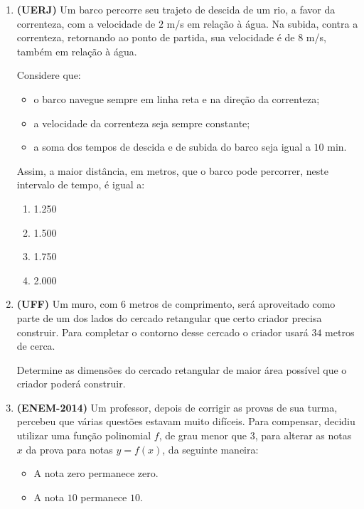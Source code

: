 {\begin{enumerate}
\item \textbf{(UERJ)} Um barco percorre seu trajeto de descida de um rio, a favor da correnteza, com a velocidade de \(2\) m/s em relação à água. Na subida, contra a correnteza, retornando ao ponto de partida, sua velocidade é de \(8\) m/s, também em relação à água.

Considere que:
\begin{itemize}
\item {} 
o barco navegue sempre em linha reta e na direção da correnteza;

\item {} 
a velocidade da correnteza seja sempre constante;

\item {} 
a soma dos tempos de descida e de subida do barco seja igual a \(10\) min.

\end{itemize}

Assim, a maior distância, em metros, que o barco pode percorrer, neste intervalo de tempo, é igual a:

\begin{enumerate}
\item 1.250
\item 1.500
\item 1.750
\item 2.000 
\end{enumerate}

\needspace{10em}
\item \textbf{(UFF)} Um muro, com \(6\) metros de comprimento, será aproveitado como parte de um dos lados do cercado retangular que certo criador precisa construir. Para completar o contorno desse cercado o criador usará \(34\) metros de cerca.

Determine as dimensões do cercado retangular de maior área possível que o criador poderá construir.

\item \textbf{(ENEM-2014)} Um professor, depois de corrigir as provas de sua turma, percebeu que várias questões estavam muito difíceis. Para compensar, decidiu utilizar uma função polinomial \(f\), de grau menor que \(3\), para alterar as notas \(x\) da prova para notas \(y = f(x)\), da seguinte maneira:
\begin{itemize}
\item {} 
A nota zero permanece zero.

\item {} 
A nota \(10\) permanece \(10\).


\end{itemize}
\end{enumerate}}
